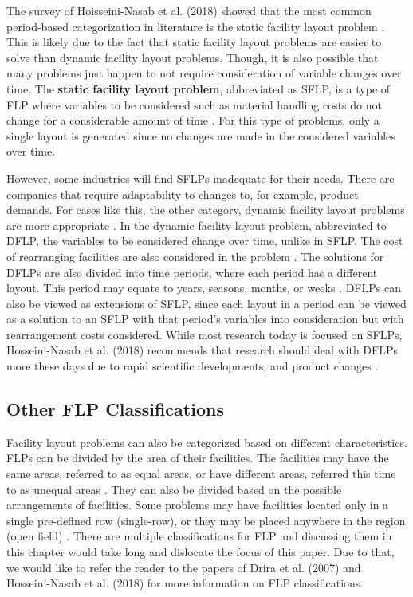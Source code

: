 The survey of Hoisseini-Nasab et al. (2018) showed that the most common period-based categorization in literature is the static facility layout problem \cite{Hosseini-Nasab2018}. This is likely due to the fact that static facility layout problems are easier to solve than dynamic facility layout problems. Though, it is also possible that many problems just happen to not require consideration of variable changes over time. The \textbf{static facility layout problem}, abbreviated as SFLP, is a type of FLP where variables to be considered such as material handling costs do not change for a considerable amount of time \cite{Perez-Gosende2020}. For this type of problems, only a single layout is generated since no changes are made in the considered variables over time.

However, some industries will find SFLPs inadequate for their needs. There are companies that require adaptability to changes to, for example, product demands. For cases like this, the other category, dynamic facility layout problems are more appropriate \cite{DerakhshanAsl2017}. In the dynamic facility layout problem, abbreviated to DFLP, the variables to be considered change over time, unlike in SFLP. The cost of rearranging facilities are also considered in the problem \cite{Hosseini2016}. The solutions for DFLPs are also divided into time periods, where each period has a different layout. This period may equate to years, seasons, months, or weeks \cite{DerakhshanAsl2017}. DFLPs can also be viewed as extensions of SFLP, since each layout in a period can be viewed as a solution to an SFLP with that period's variables into consideration but with rearrangement costs considered. While most research today is focused on SFLPs, Hosseini-Nasab et al. (2018) recommends that research should deal with DFLPs more these days due to rapid scientific developments, and product changes \cite{Hosseini-Nasab2018}.

\subsection{Other FLP Classifications}
Facility layout problems can also be categorized based on different characteristics. FLPs can be divided by the area of their facilities. The facilities may have the same areas, referred to as equal areas, or have different areas, referred this time to as unequal areas \cite{DerakhshanAsl2017}. They can also be divided based on the possible arrangements of facilities. Some problems may have facilities located only in a single pre-defined row (single-row), or they may be placed anywhere in the region (open field) \cite{Drira2007}. There are multiple classifications for FLP and discussing them in this chapter would take long and dislocate the focus of this paper. Due to that, we would like to refer the reader to the papers of Drira et al. (2007) \cite{Drira2007} and Hosseini-Nasab et al. (2018) \cite{Hosseini-Nasab2018} for more information on FLP classifications.

